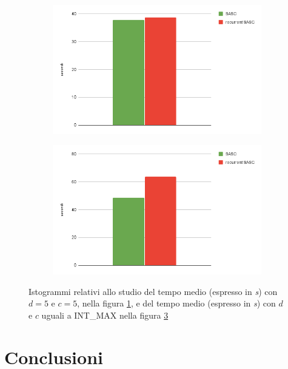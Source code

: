 \documentclass[12pt]{report}
\begin{document}
  \begin{figure}[H]
    \begin{subfigure}{0.5\textwidth}
      \includegraphics[scale = 0.4]{img/time1.png}
      \caption{}
      \label{img:ista}
    \end{subfigure}
    \begin{subfigure}{0.5\textwidth}
      \includegraphics[scale = 0.4]{img/time2.png}
      \caption{}
      \label{img:istb}
    \end{subfigure}
    \caption{Istogrammi relativi allo studio del tempo medio  (espresso in \emph{s}) con $d=5$ e $c=5$, nella figura \ref{img:ista}, e del tempo medio (espresso in \emph{s}) con $d$ e $c$ uguali a  INT\_MAX nella figura \ref{img:istb}}
  \end{figure}

\chapter{Conclusioni}
\end{document}
